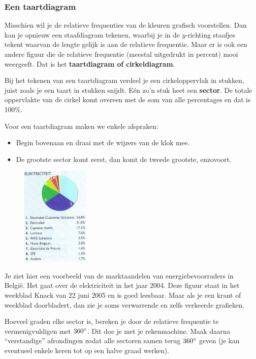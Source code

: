 \documentclass[12pt,twoside]{article}
\begin{document}
\subsubsection*{Een taartdiagram}
Misschien wil je de relatieve frequenties van de kleuren grafisch voorstellen. Dan kan je opnieuw een
staafdiagram tekenen, waarbij je in de $y$-richting staafjes tekent waarvan de lengte gelijk is aan de
relatieve frequentie.
Maar er is ook een andere figuur die de relatieve frequentie (meestal uitgedrukt in percent) mooi
weergeeft. Dat is het {\bf taartdiagram of cirkeldiagram}.

Bij het tekenen van een taartdiagram verdeel je een cirkeloppervlak in stukken, juist zoals je een
taart in stukken snijdt. Eén zo'n stuk heet een {\bf sector}. De totale oppervlakte van de cirkel komt overeen
met de som van alle percentages en dat is 100\%.

Voor een taartdiagram maken we enkele afspraken:
\begin{itemize}
  \item Begin bovenaan en draai met de wijzers van de klok mee.
  \item De grootste sector komt eerst, dan komt de tweede
grootste, enzovoort.
\end{itemize}

\newpage
\begin{figure}
  \includegraphics[width=0.3\textwidth]{cirkeldiagram_electriciteit}
\end{figure}
Je ziet hier een voorbeeld van de marktaandelen van
energiebevoorraders in België. Het gaat over de elektriciteit in
het jaar 2004. Deze figuur staat in het weekblad Knack van 22
juni 2005 en is goed leesbaar. Maar als je een krant of
weekblad doorbladert, dan zie je soms verwarrende en zelfs
verkeerde grafieken.

Hoeveel graden elke sector is, bereken je door de relatieve
frequentie te vermenigvuldigen met $360^\circ$. Dit doe je met je
rekenmachine. Maak daarna “verstandige” afrondingen zodat
alle sectoren samen terug $360^\circ$ geven (je kan
eventueel enkele keren tot op een halve graad werken).
\end{document}

